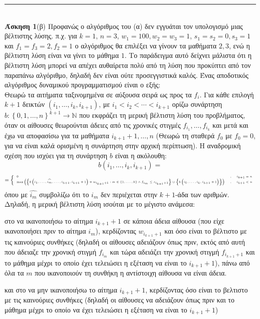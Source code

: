 \documentclass[12pt]{article}
\newenvironment{b_item}{
\begin{itemize}
  \setlength{\itemsep}{0pt}
  \setlength{\parskip}{0pt}
  \setlength{\parsep}{0pt}
}{\end{itemize}}
\newcommand{\HRule}{\rule{\linewidth}{0.1mm}}
\begin{document}
\HRule\\
{\bf Άσκηση 1}(β) Προφανώς ο αλγόριθμος του (α) δεν εγγυάται τον υπολογισμό μιας βέλτιστης λύσης. π.χ. για $k=1$, $n=3$, $w_1=100, w_2=w_3=1$, $s_1=s_2=0, s_3=1$ και $f_1=f_3=2, f_2=1$ ο αλγόριθμος θα επιλέξει να γίνουν τα μαθήματα $2,3$, ενώ η βέλτιστη λύση είναι να γίνει το μάθημα $1$. Το παράδειγμα αυτό δείχνει μάλιστα ότι η βέλτιστη λύση μπορεί να απέχει αυθαίρετα πολύ από τη λύση που προκύπτει από τον παραπάνω αλγόριθμο, δηλαδή δεν είναι ούτε προσεγγιστικά καλός. Ένας αποδοτικός αλγόριθμος δυναμικού προγραμματισμού είναι ο εξής:\\
Θεωρώ τα αιτήματα ταξινομημένα σε αύξουσα σειρά ως προς τα $f_i$. Για κάθε επιλογή $k+1$ δεικτών $\left(i_1,\ldots,i_k,i_{k+1}\right)$, με $i_1<i_2<\cdots<i_{k+1}$ ορίζω συνάρτηση $b:\left\{0,1,\ldots,n\right\}^{k+1}\to\mathbb{N}$ που εκφράζει τη μερική βέλτιστη λύση του προβλήματος, όταν οι αίθουσες θεωρούνται άδειες από τις χρονικές στιγμές $f_{i_1},\ldots,f_{i_k}$ και μετά και έχω να αποφασίσω για τα μαθήματα $i_{k+1}+1,\ldots,n$ (Θεωρώ τη σταθερά $f_0$ με $f_0=0$, για να είναι καλά ορισμένη η συνάρτηση στην αρχική περίπτωση). Η αναδρομική σχέση που ισχύει για τη συνάρτηση $b$ είναι η ακόλουθη:
$$b\left(i_1,\ldots,i_k,i_{k+1}\right)=$$
$$\tiny=\left\{\begin{array}{lcl}
0&,&i_{k+1}=n\\
\max\left(\left\{b\left(i_1,\ldots,\widehat{i_m},\ldots,i_{k+1},i_{k+1}+1\right)+w_{i_{k+1}+1}:m\in\left\{1,\ldots,k\right\}\land f_{i_m}\leq s_{i_{k+1}+1}\right\}\cup\left\{b\left(i_1,\ldots,i_k,i_{k+1}+1\right)\right\}\right)&,&i_{k+1}<n\\
\end{array}\right.$$
όπου με $\widehat{i_m}$ συμβολίζω ότι το $i_m$ δεν περιέχεται στην $k+1$-άδα των αριθμών. Δηλαδή, η μερική βέλτιστη λύση ισούται με το μέγιστο ανάμεσα:
\begin{b_item}
\item στο να ικανοποιήσω το αίτημα $i_{k+1}+1$ σε κάποια άδεια αίθουσα (που είχε ικανοποιήσει πριν το αίτημα $i_m$), κερδίζοντας $w_{i_{k+1}+1}$ και όσο είναι το βέλτιστο με τις καινούριες συνθήκες (δηλαδή οι αίθουσες αδειάζουν όπως πριν, εκτός από αυτή που άδειαζε την χρονική στιγμή $f_{i_m}$ και τώρα αδειάζει την χρονική στιγμή $f_{i_{k+1}+1}$ και το μάθημα μέχρι το οποίο έχει τελειώσει η εξέταση να είναι το $i_{k+1}+1$), πάνω από όλα τα $m$ που ικανοποιούν τη συνθήκη η αντίστοιχη αίθουσα να είναι άδεια.
\item και στο να μην ικανοποιήσω το αίτημα $i_{k+1}+1$, κερδίζοντας όσο είναι το βελτιστο με τις καινούριες συνθήκες (δηλαδή οι αίθουσες να αδειάζουν όπως πριν και το μάθημα μέχρι το οποίο να έχει τελειώσει η εξέταση να είναι το $i_{k+1}+1$)
\end{b_item}
\end{document}
